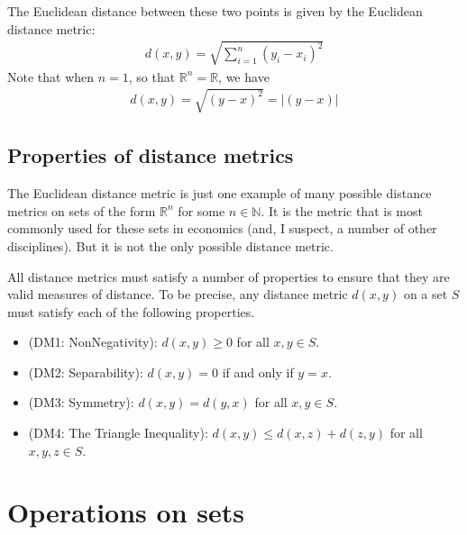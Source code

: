\documentclass[letterpaper,10pt,english]{jupyterBook}
\begin{document}
\sphinxAtStartPar
The Euclidean distance between these two points is given by the Euclidean distance metric:
\begin{equation*}
\begin{split}d (x, y) = \sqrt{\sum_{i = 1}^{n} (y_i - x_i)^2}\end{split}
\end{equation*}
\sphinxAtStartPar
Note that when \(n = 1\), so that \(\mathbb{R}^n = \mathbb{R}\), we have
\begin{equation*}
\begin{split}d (x, y) = \sqrt{(y - x)^2} = \lvert(y - x)\rvert\end{split}
\end{equation*}

\subsection{Properties of distance metrics}
\label{\detokenize{02.sets_numbers_coordinates_distances:properties-of-distance-metrics}}
\sphinxAtStartPar
The Euclidean distance metric is just one example of many possible distance metrics on sets of the form \(\mathbb{R}^n\) for some \(n \in \mathbb{N}\). It is the metric that is most commonly used for these sets in economics (and, I suspect, a number of other disciplines). But it is not the only possible distance metric.

\sphinxAtStartPar
All distance metrics must satisfy a number of properties to ensure that they are valid measures of distance. To be precise, any distance metric \(d(x, y)\) on a set \(S\) must satisfy each of the following properties.
\begin{itemize}
\item {} 
\sphinxAtStartPar
(DM1: Non\sphinxhyphen{}Negativity): \(d(x, y) \geqslant 0\) for all \(x, y \in S\).

\item {} 
\sphinxAtStartPar
(DM2: Separability): \(d(x, y) = 0\) if and only if \(y = x\).

\item {} 
\sphinxAtStartPar
(DM3: Symmetry): \(d(x, y) = d(y , x)\) for all \(x, y \in S\).

\item {} 
\sphinxAtStartPar
(DM4: The Triangle Inequality): \(d (x, y ) \leqslant d (x, z) + d (z, y)\) for all \(x, y, z \in S\).

\end{itemize}


\section{Operations on sets}
\label{\detokenize{02.sets_numbers_coordinates_distances:operations-on-sets}}
\end{document}

